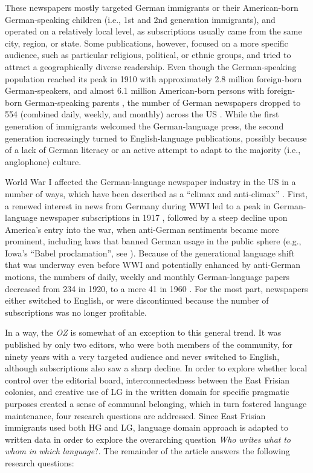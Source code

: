\documentclass[output=paper]{langsci/langscibook}
\begin{document}
These newspapers mostly targeted German immigrants or their American-born German-speaking children (i.e., 1st and 2nd generation immigrants), and operated on a relatively local level, as subscriptions usually came from the same city, region, or state. Some publications, however, focused on a more specific audience, such as particular religious, political, or ethnic groups, and tried to attract a geographically diverse readership. Even though the German-speaking population reached its peak in 1910 with approximately 2.8 million foreign-born German-speakers, and almost 6.1 million American-born persons with foreign-born German-speaking parents \citep[213]{Kloss1966}, the number of German newspapers dropped to 554 (combined daily, weekly, and monthly) across the US \citep[191]{Haller1988}. While the first generation of immigrants welcomed the German-lan\-guage press, the second generation increasingly turned to English-language publications, possibly because of a lack of German literacy or an active attempt to adapt to the majority (i.e., anglophone) culture.

World War I affected the German-language newspaper industry in the US in a number of ways, which have been described as a “climax and anti-climax” \citep[237]{Kloss1966}. First, a renewed interest in news from Germany during WWI led to a peak in German-language newspaper subscriptions in 1917 \citep[244]{Wittke1973}, followed by a steep decline upon America’s entry into the war, when anti-German sentiments became more prominent, including laws that banned German usage in the public sphere (e.g., Iowa’s “Babel proclamation”, see \citealt{StateHistoricalSocietyofIowa2019}). Because of the generational language shift that was underway even before WWI and potentially enhanced by anti-German motions, the numbers of daily, weekly and monthly German-language papers decreased from 234 in 1920, to a mere 41 in 1960 \citep[190]{Haller1988}. For the most part, newspapers either switched to English, or were discontinued because the number of subscriptions was no longer profitable.

In a way, the \textit{OZ} is somewhat of an exception to this general trend. It was published by only two editors, who were both members of the community, for ninety years with a very targeted audience and never switched to English, although subscriptions also saw a sharp decline. In order to explore whether local control over the editorial board, interconnectedness between the East Frisian colonies, and creative use of LG in the written domain for specific pragmatic purposes created a sense of communal belonging, which in turn fostered language maintenance, four research questions are addressed. Since East Frisian immigrants used both HG and LG,  language domain approach is adapted to written data in order to explore the overarching question \textit{Who} \textit{writes} \textit{what} \textit{to} \textit{whom} \textit{in} \textit{which} \textit{language}?. The remainder of the article answers the following research questions:
\end{document}
